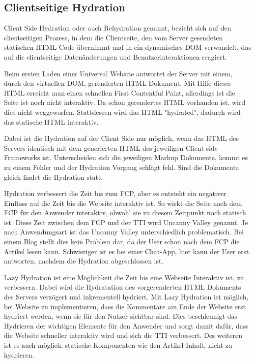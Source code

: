 \documentclass[runningheads]{llncs}
\begin{document}
\subsection{Clientseitige Hydration}
\label{subsec:Clientseitige Hydration}
Client Side Hydration oder auch Rehydration genannt, 
bezieht sich auf den clientseitigen Prozess, 
in dem die Clientseite, 
den vom Server gesendeten statischen HTML-Code übernimmt und 
in ein dynamisches DOM verwandelt, 
das auf die clientseitige Datenänderungen und Benutzerinteraktionen reagiert. 

Beim ersten Laden einer Universal Website antwortet der Server mit einem, 
durch den virtuellen DOM, gerenderten HTML Dokument. 
Mit Hilfe dieses HTML erreicht man einen schnellen First Contentful Paint, 
allerdings ist die Seite ist noch nicht interaktiv. 
Da schon gerendertes HTML vorhanden ist, 
wird dies nicht weggeworfen. Stattdessen wird das HTML "hydrated", 
dadurch wird das statische HTML interaktiv. 

Dabei ist die Hydration auf der Client Side nur möglich, 
wenn das HTML des Servers identisch mit dem generierten HTML des jeweiligen 
Client-side Frameworks ist. 
Unterscheiden sich die jeweiligen Markup Dokumente, 
kommt es zu einem Fehler und der Hydration Vorgang schlägt fehl. 
Sind die Dokumente gleich findet die Hydration statt.

Hydration verbessert die Zeit bis zum FCP, 
aber es entsteht ein negativer Einfluss auf die Zeit bis die Website interaktiv ist. 
So wirkt die Seite nach dem FCP für den Anwender interaktiv, 
obwohl sie zu diesem Zeitpunkt noch statisch ist. 
Diese Zeit zwischen dem FCP und der TTI wird Uncanny Valley genannt. 
Je nach Anwendungsart ist das Uncanny Valley unterschiedlich problematisch. 
Bei einem Blog stellt dies kein Problem dar, 
da der User schon nach dem FCP die Artikel lesen kann. 
Schwieriger ist es bei einer Chat-App, 
hier kann der User erst antworten, 
nachdem die Hydration abgeschlossen ist.

Lazy Hydration ist eine Möglichkeit die Zeit bis eine Webseite Interaktiv ist, 
zu verbessern. Dabei wird die Hydratation des vorgerenderten HTML Dokuments des Servers verzögert und 
inkrementell hydriert. Mit Lazy Hydration ist möglich, 
bei Website zu implementieren, 
dass die Kommentare am Ende der Website erst hydriert werden, 
wenn sie für den Nutzer sichtbar sind. 
Dies beschleunigt das Hydrieren der wichtigen Elemente für den Anwender und sorgt damit dafür, 
dass die Website schneller interaktiv wird und sich die TTI verbessert. 
Des weiteren ist es auch möglich, 
statische Komponenten wie den Artikel Inhalt, nicht zu hydrieren.
\end{document}
